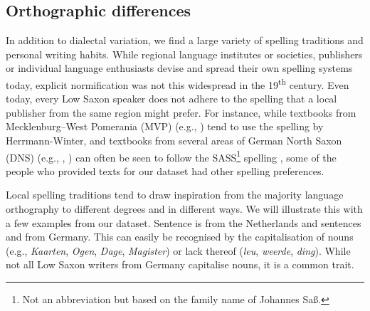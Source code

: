 \documentclass[output=paper,colorlinks,citecolor=brown]{langscibook}
\begin{document}


\subsection{Orthographic differences}\label{orthography}

In addition to dialectal variation, we find a large variety of spelling traditions and personal writing habits. While regional language institutes or societies, publishers or individual language enthusiasts devise and spread their own spelling systems today, explicit normification was not this widespread in the 19\textsuperscript{th} century. Even today, every Low Saxon speaker does not adhere to the spelling that a local publisher from the same region might prefer. For instance, while textbooks from Mecklenburg--West Pomerania (MVP) (e.g., \citealt{Herrmann-Winter2006}) tend to use the spelling by Herrmann-Winter, and textbooks from several areas of German North Saxon (DNS) (e.g., \citealt{Arbatzat2016}, \citealt{HiestermannKonen-Witzel2021}) can often be seen to follow the SASS\footnote{Not an abbreviation but based on the family name of Johannes Saß.} spelling \citep{KahlThies2009}, some of the people who provided texts for our dataset had other spelling preferences. 

Local spelling traditions tend to draw inspiration from the majority language orthography to different degrees and in different ways. We will illustrate this with a few examples from our dataset. Sentence  is from the Netherlands and sentences  and  from Germany. This can easily be recognised by the capitalisation of nouns (e.g., \textit{Kaarten}, \textit{Ogen}, \textit{Dage}, \textit{Magister}) or lack thereof (\textit{leu}, \textit{weerde}, \textit{ding}). While not all Low Saxon writers from Germany capitalise nouns, it is a common trait. 
\end{document}
